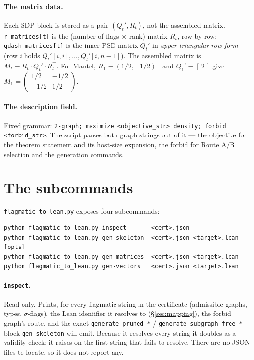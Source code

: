 \documentclass[11pt]{article}
\begin{document}
\paragraph{The matrix data.}
Each SDP block is stored as a pair $(Q_t', R_t)$, not the assembled matrix.
\texttt{r\_matrices[t]} is the (number of flags $\times$ rank) matrix $R_t$, row
by row; \texttt{qdash\_matrices[t]} is the inner PSD matrix $Q_t'$ in
\emph{upper-triangular row form} (row $i$ holds
$Q_t'[i,i],\ldots,Q_t'[i,n{-}1]$). The assembled matrix is
$M_t = R_t \cdot Q_t' \cdot R_t^\top$. For Mantel, $R_1=(1/2,-1/2)^\top$ and
$Q_1'=[\,2\,]$ give
$M_1 = \left(\begin{smallmatrix} 1/2 & -1/2 \\ -1/2 & 1/2 \end{smallmatrix}\right)$.

\paragraph{The description field.}
Fixed grammar:
\texttt{2-graph; maximize <objective\_str> density; forbid <forbid\_str>}. The
script parses both graph strings out of it --- the objective for the theorem
statement and its host-size expansion, the forbid for Route A/B selection and the
generation commands.

\section{The subcommands}
\label{sec:cli}

\texttt{flagmatic\_to\_lean.py} exposes four subcommands:
\begin{lstlisting}[language={}]
python flagmatic_to_lean.py inspect       <cert>.json
python flagmatic_to_lean.py gen-skeleton  <cert>.json <target>.lean [opts]
python flagmatic_to_lean.py gen-matrices  <cert>.json <target>.lean
python flagmatic_to_lean.py gen-vectors   <cert>.json <target>.lean
\end{lstlisting}

\paragraph{\texttt{inspect}.} Read-only. Prints, for every flagmatic string in
the certificate (admissible graphs, types, $\sigma$-flags), the Lean identifier
it resolves to (\S\ref{sec:mapping}), the forbid graph's route, and the exact
\texttt{generate\_pruned\_*} / \texttt{generate\_subgraph\_free\_*} block
\texttt{gen-skeleton} will emit. Because it resolves every string it doubles as a
validity check: it raises on the first string that fails to resolve. There are no
JSON files to locate, so it does not report any.
\end{document}
